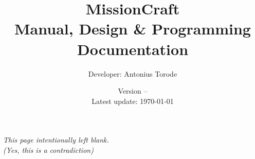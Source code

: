 \documentclass[openany,a4paper,10pt]{book}
\title{MissionCraft \\  Manual, Design \& Programming Documentation}
\author{Developer: Antonius Torode}
\date{Version -- \version \\ Latest update: \today}
\begin{document}
\frontmatter
\maketitle

\tableofcontents
\newpage
\vspace*{\fill}
\begin{center}
	\textit{This page intentionally left blank. \\(Yes, this is a contradiction)}
\end{center}
\vspace*{\fill}

\mainmatter
\pagestyle{fancy}
\fancyhf{}
\fancyhead[RO, LE]{\thepage}













\backmatter
%
%
\printindex
\end{document}

